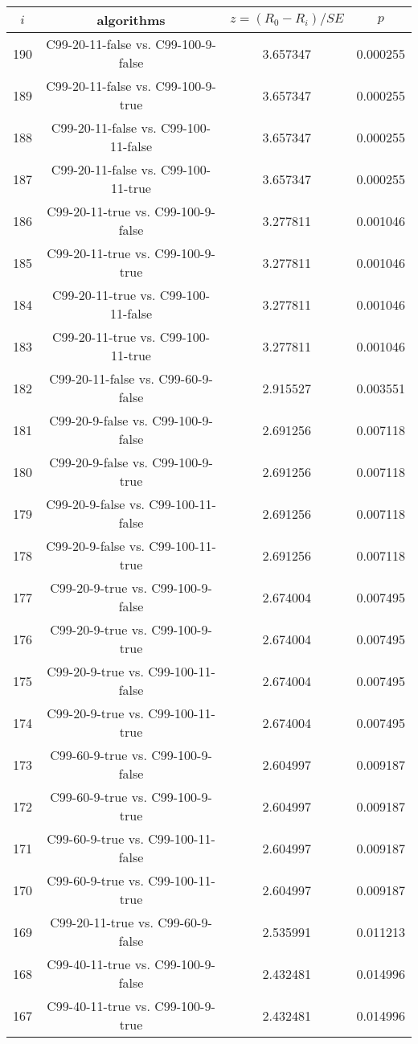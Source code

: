 \documentclass[a4paper,10pt]{article}
\begin{document}
\begin{landscape}
\begin{table}[!htp]
\centering\scriptsize
\begin{tabular}{cccc}
$i$&algorithms&$z=(R_0 - R_i)/SE$&$p$\\
\hline190&C99-20-11-false vs. C99-100-9-false&3.657347&0.000255\\
189&C99-20-11-false vs. C99-100-9-true&3.657347&0.000255\\
188&C99-20-11-false vs. C99-100-11-false&3.657347&0.000255\\
187&C99-20-11-false vs. C99-100-11-true&3.657347&0.000255\\
186&C99-20-11-true vs. C99-100-9-false&3.277811&0.001046\\
185&C99-20-11-true vs. C99-100-9-true&3.277811&0.001046\\
184&C99-20-11-true vs. C99-100-11-false&3.277811&0.001046\\
183&C99-20-11-true vs. C99-100-11-true&3.277811&0.001046\\
182&C99-20-11-false vs. C99-60-9-false&2.915527&0.003551\\
181&C99-20-9-false vs. C99-100-9-false&2.691256&0.007118\\
180&C99-20-9-false vs. C99-100-9-true&2.691256&0.007118\\
179&C99-20-9-false vs. C99-100-11-false&2.691256&0.007118\\
178&C99-20-9-false vs. C99-100-11-true&2.691256&0.007118\\
177&C99-20-9-true vs. C99-100-9-false&2.674004&0.007495\\
176&C99-20-9-true vs. C99-100-9-true&2.674004&0.007495\\
175&C99-20-9-true vs. C99-100-11-false&2.674004&0.007495\\
174&C99-20-9-true vs. C99-100-11-true&2.674004&0.007495\\
173&C99-60-9-true vs. C99-100-9-false&2.604997&0.009187\\
172&C99-60-9-true vs. C99-100-9-true&2.604997&0.009187\\
171&C99-60-9-true vs. C99-100-11-false&2.604997&0.009187\\
170&C99-60-9-true vs. C99-100-11-true&2.604997&0.009187\\
169&C99-20-11-true vs. C99-60-9-false&2.535991&0.011213\\
168&C99-40-11-true vs. C99-100-9-false&2.432481&0.014996\\
167&C99-40-11-true vs. C99-100-9-true&2.432481&0.014996\\

\end{tabular}
\end{table}
\end{landscape}
\end{document}
